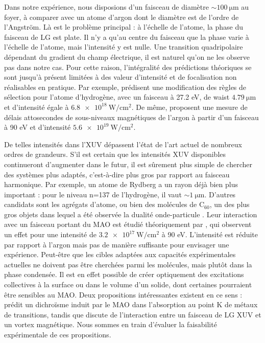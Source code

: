 Dans notre expérience, nous disposions d'un faisceau de diamètre $\sim \SI{100}{\micro\metre}$ au foyer, à comparer avec un atome d'argon dont le diamètre est de l'ordre de l'Angström. Là est le problème principal : à l'échelle de l'atome, la phase du faisceau de LG est plate. Il n'y a qu'au centre du faisceau que la phase varie à l'échelle de l'atome, mais l'intensité y est nulle. Une transition quadripolaire dépendant du gradient du champ électrique, il est naturel qu'on ne les observe pas  dans notre cas. Pour cette raison, l'intégralité des prédictions théoriques se sont jusqu'à présent limitées à des valeur d'intensité et de focalisation non réalisables en pratique. Par exemple,  prédisent une modification des règles de sélection pour l'atome d'hydrogène, avec un faisceau à 27.2 eV, de waist $\SI{4.79}{\micro\metre}$ et d'intensité égale à $\SI{6.8e18}{\W\per\centi\metre\squared}$. De même,  proposent une mesure de délais attosecondes de sous-niveaux magnétiques de l'argon à partir d'un faisceau à 90 eV et d'intensité $\SI{5.6e19}{\W\per\centi\metre\squared}$.

De telles intensités dans l'XUV dépassent l'état de l'art actuel de nombreux ordres de grandeurs. S'il est certain que les intensités XUV disponibles continueront d'augmenter dans le futur, il est sûrement plus simple de chercher des systèmes plus adaptés, c'est-à-dire plus gros par rapport au faisceau harmonique. Par exemple, un atome de Rydberg a un rayon déjà bien plus important : pour le niveau n=137 de l'hydrogène, il vaut $\sim\SI{1}{\micro\metre}$. D'autres candidats sont les agrégats d'atome, ou bien des molécules de $\text{C}_{60}$, un des plus gros objets dans lequel a été observée la dualité onde-particule . Leur interaction avec un faisceau portant du MAO est étudié théoriquement par , qui observent un effet pour une intensité de $\SI{3.2e17}{\W\per\centi\metre\squared}$ à 90 eV. L'intensité est réduite par rapport à l'argon mais pas de manière suffisante pour envisager une expérience.\linebreak
Peut-être que les cibles adaptées aux capacités expérimentales actuelles ne doivent pas être cherchées parmi les molécules, mais plutôt dans la phase condensée. Il est en effet possible de créer optiquement des excitations collectives à la surface ou dans le volume d'un solide, dont certaines pourraient être sensibles au MAO. Deux propositions intéressantes existent en ce sens :  prédit un dichroïsme induit par le MAO dans l'absorption au point K de métaux de transitions, tandis que  discute de l'interaction entre un faisceau de LG XUV et un vortex magnétique. Nous sommes en train d'évaluer la faisabilité expérimentale de ces propositions.


